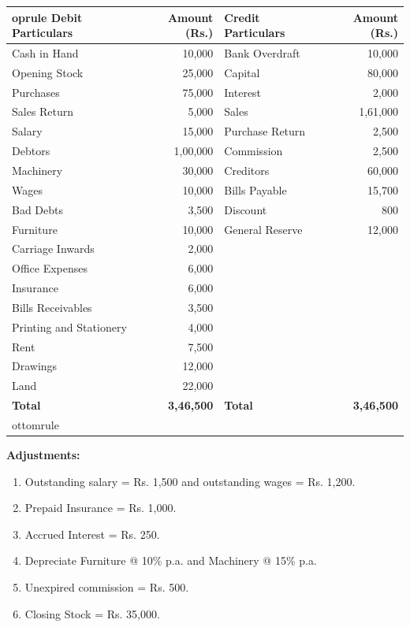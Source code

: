 \documentclass[11pt,a4paper]{article}
\begin{document}
\begin{center}
\small

\begin{tabular}{p{4.5cm} r p{4.5cm} r}
 oprule
   \textbf{Debit Particulars} &   \textbf{Amount (Rs.)} &   \textbf{Credit Particulars} &   \textbf{Amount (Rs.)} \\
\midrule
Cash in Hand & 10,000 & Bank Overdraft & 10,000 \\
Opening Stock & 25,000 & Capital & 80,000 \\
Purchases & 75,000 & Interest & 2,000 \\
Sales Return & 5,000 & Sales & 1,61,000 \\
Salary & 15,000 & Purchase Return & 2,500 \\
Debtors & 1,00,000 & Commission & 2,500 \\
Machinery & 30,000 & Creditors & 60,000 \\
Wages & 10,000 & Bills Payable & 15,700 \\
Bad Debts & 3,500 & Discount & 800 \\
Furniture & 10,000 & General Reserve & 12,000 \\
Carriage Inwards & 2,000 & & \\
Office Expenses & 6,000 & & \\
Insurance & 6,000 & & \\
Bills Receivables & 3,500 & & \\
Printing and Stationery & 4,000 & & \\
Rent & 7,500 & & \\
Drawings & 12,000 & & \\
Land & 22,000 & & \\
\midrule
   \textbf{Total} &   \textbf{3,46,500} &   \textbf{Total} &   \textbf{3,46,500} \\
ottomrule
\end{tabular}
\end{center}




\noindent   \textbf{Adjustments:}

\begin{enumerate}[leftmargin=*,itemsep=2pt,topsep=3pt]
  \item Outstanding salary = Rs. 1,500 and outstanding wages = Rs. 1,200.
  \item Prepaid Insurance = Rs. 1,000.
  \item Accrued Interest = Rs. 250.
  \item Depreciate Furniture @ 10\% p.a. and Machinery @ 15\% p.a.
  \item Unexpired commission = Rs. 500.
  \item Closing Stock = Rs. 35,000.
\end{enumerate}
\end{document}
